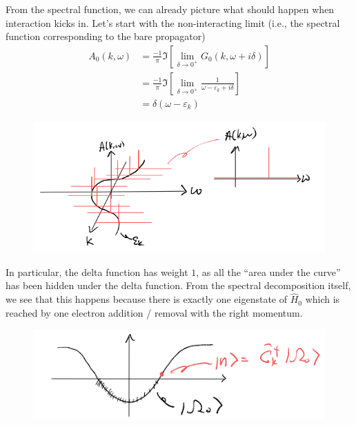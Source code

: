 From the spectral function, we can already picture what should happen when interaction kicks in. Let's start with the non-interacting limit (i.e., the spectral function corresponding to the bare propagator)
\begin{align*}
    A_0\left( k,\omega \right) &=\frac{-1}{\pi}\Im \left[ \lim_{\delta \rightarrow 0^+} G_0\left( k,\omega +i\delta \right) \right] \\
    &=\frac{-1}{\pi}\Im \left[ \lim_{\delta \rightarrow 0^+} \frac{1}{\omega -\varepsilon _k+i\delta} \right] \\
    &=\delta \left( \omega -\varepsilon _k \right)
\end{align*}

\begin{figure}[ht]
    \centering
    \includegraphics[width=\textwidth]{jupyterbook/data/fig/lec16-fig00.png}
\end{figure}

In particular, the delta function has weight $1$, as all the ``area under the curve'' has been hidden under the delta function. From the spectral decomposition itself, we see that this happens because there is exactly one eigenstate of $\hat{H}_0$ which is reached by one electron addition / removal with the right momentum.

\begin{figure}[ht]
    \centering
    \includegraphics[width=\textwidth]{jupyterbook/data/fig/lec16-fig01.png}
\end{figure}

